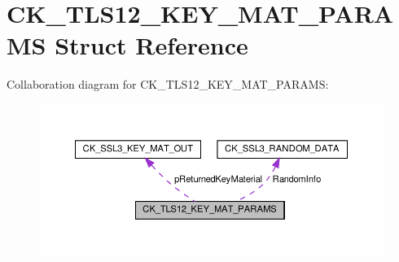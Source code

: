 \hypertarget{struct_c_k___t_l_s12___k_e_y___m_a_t___p_a_r_a_m_s}{}\section{C\+K\+\_\+\+T\+L\+S12\+\_\+\+K\+E\+Y\+\_\+\+M\+A\+T\+\_\+\+P\+A\+R\+A\+MS Struct Reference}
\label{struct_c_k___t_l_s12___k_e_y___m_a_t___p_a_r_a_m_s}


Collaboration diagram for C\+K\+\_\+\+T\+L\+S12\+\_\+\+K\+E\+Y\+\_\+\+M\+A\+T\+\_\+\+P\+A\+R\+A\+MS\+:
\nopagebreak
\begin{figure}[H]
\begin{center}
\leavevmode
\includegraphics[width=350pt]{struct_c_k___t_l_s12___k_e_y___m_a_t___p_a_r_a_m_s__coll__graph}
\end{center}
\end{figure}
